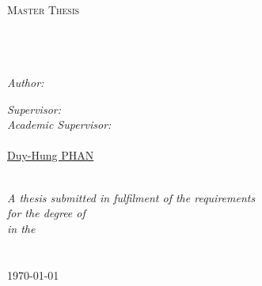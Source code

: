 \documentclass[13pt, oneside]{Thesis} %
\begin{document}
\begin{titlepage}
\begin{center}

\textsc{\LARGE \univname}\\[1.5cm] %
\textsc{\Large Master Thesis}\\[0.5cm] %

\HRule \\[0.4cm] %
{\huge \bfseries \ttitle}\\[0.4cm] %
\HRule \\[1.5cm] %
 
\begin{minipage}{0.4\textwidth}
\begin{flushleft} \normalsize
\emph{Author:}\\
\href{hoang@eurecom.fr}{\authornames} %
\end{flushleft}
\end{minipage}
\begin{minipage}{0.4\textwidth}
\begin{flushright} \normalsize
\emph{Supervisor:} \\
\href{michiard@eurecom.fr}{\supname} %
\emph{Academic Supervisor:}\\
\href{michiard@eurecom.fr}{\supname}\\
\href{phan@eurecom.fr}{Duy-Hung PHAN}\\
\end{flushright}
\end{minipage}\\[3cm]
 
\large \textit{A thesis submitted in fulfilment of the requirements\\ for the degree of \degreename}\\[0.3cm] %
\textit{in the}\\[0.4cm]
\groupname\\\deptname\\[2cm] %
 
{\large \today}\\[4cm] %
 
\vfill
\end{center}

\end{titlepage}
\end{document}

